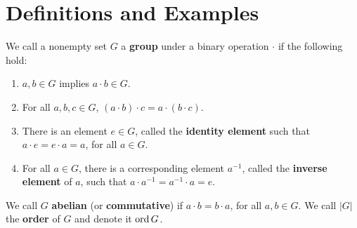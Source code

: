 
\section{Definitions and Examples}
\label{section1}

\begin{definition}
    We call a nonempty set $G$ a \textbf{group} under a binary operation $\cdot$ if the following
    hold:
        \begin{enumerate}[label=(\arabic*)]
            \item $a,b \in G$ implies  $a \cdot b \in G$.

            \item For all $a,b,c \in G$,  $(a \cdot b) \cdot c=a \cdot (b \cdot c)$.

            \item There is an element $e \in G$, called the \textbf{identity element} such that $a
                \cdot e=e \cdot a=a$, for all  $a \in G$.

            \item For all  $a \in G$, there is a corresponding element  $a^{-1}$, called the
            \textbf{inverse element} of $a$, such that  $a \cdot a^{-1}=a^{-1} \cdot a=e$.
        \end{enumerate}
        We call $G$ \textbf{abelian} (or \textbf{commutative}) if $a \cdot b = b \cdot a$, for all
        $a,b \in G$. We call  $|G|$ the \textbf{order} of $G$ and denote it  $\operatorname{ord}{G}$.
\end{definition}

